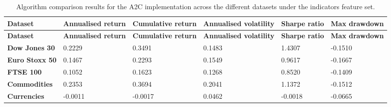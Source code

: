 \begin{longtable}{|l|p{2.1cm}|p{2.1cm}|p{2.1cm}|p{1.5cm}|p{2cm}|}
    \caption{Algorithm comparison results for the A2C implementation across the different datasets under the indicators feature set.}
    \label{tab:experiment_algorithms_a2c}
    \\ 
    \hline
    \textbf{Dataset} & \textbf{Annualised return} & \textbf{Cumulative return} & \textbf{Annualised volatility} & \textbf{Sharpe ratio} & \textbf{Max drawdown}  \\ \midrule
    \endfirsthead

    \hline
    \textbf{Dataset} & \textbf{Annualised return} & \textbf{Cumulative return} & \textbf{Annualised volatility} & \textbf{Sharpe ratio} & \textbf{Max drawdown}  \\ \midrule
    \endhead

    \endfoot
    \hline

    \textbf{Dow Jones 30} & 0.2229 & 0.3491 & 0.1483 & 1.4307 & -0.1510 \\ \hline
    \textbf{Euro Stoxx 50} & 0.1467 & 0.2293 & 0.1549 & 0.9617 & -0.1667 \\ \hline
    \textbf{FTSE 100} & 0.1052 & 0.1623 & 0.1268 & 0.8520 & -0.1409 \\ \hline
    \textbf{Commodities} & 0.2353 & 0.3694 & 0.2041 & 1.1372 & -0.1512 \\ \hline
    \textbf{Currencies} & -0.0011 & -0.0017 & 0.0462 & -0.0018 & -0.0665 \\ \hline 
\end{longtable}